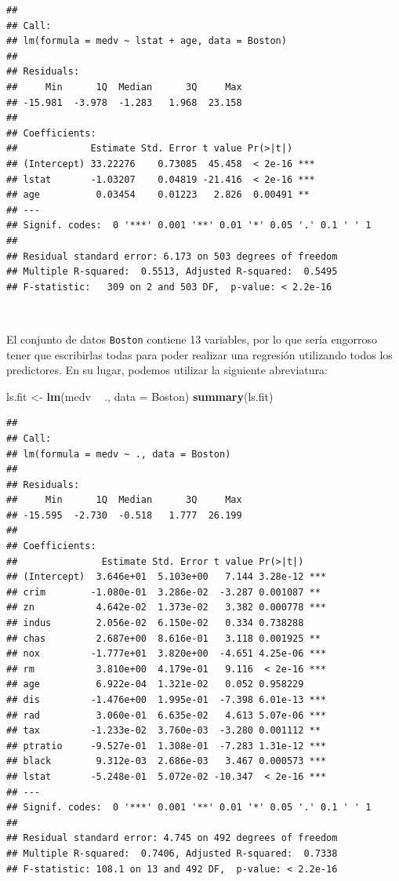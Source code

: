 \documentclass[]{book}
\newenvironment{Shaded}{\begin{snugshade}}{\end{snugshade}}
\newcommand{\KeywordTok}[1]{\textcolor[rgb]{0.13,0.29,0.53}{\textbf{#1}}}
\newcommand{\DataTypeTok}[1]{\textcolor[rgb]{0.13,0.29,0.53}{#1}}
\newcommand{\StringTok}[1]{\textcolor[rgb]{0.31,0.60,0.02}{#1}}
\newcommand{\OperatorTok}[1]{\textcolor[rgb]{0.81,0.36,0.00}{\textbf{#1}}}
\newcommand{\NormalTok}[1]{#1}
\begin{document}
\begin{verbatim}
## 
## Call:
## lm(formula = medv ~ lstat + age, data = Boston)
## 
## Residuals:
##     Min      1Q  Median      3Q     Max 
## -15.981  -3.978  -1.283   1.968  23.158 
## 
## Coefficients:
##             Estimate Std. Error t value Pr(>|t|)    
## (Intercept) 33.22276    0.73085  45.458  < 2e-16 ***
## lstat       -1.03207    0.04819 -21.416  < 2e-16 ***
## age          0.03454    0.01223   2.826  0.00491 ** 
## ---
## Signif. codes:  0 '***' 0.001 '**' 0.01 '*' 0.05 '.' 0.1 ' ' 1
## 
## Residual standard error: 6.173 on 503 degrees of freedom
## Multiple R-squared:  0.5513, Adjusted R-squared:  0.5495 
## F-statistic:   309 on 2 and 503 DF,  p-value: < 2.2e-16
\end{verbatim}

~

El conjunto de datos \texttt{Boston} contiene 13 variables, por lo que
sería engorroso tener que escribirlas todas para poder realizar una
regresión utilizando todos los predictores. En su lugar, podemos
utilizar la siguiente abreviatura:

\begin{Shaded}
\begin{Highlighting}[]
\NormalTok{ls.fit <-}\StringTok{ }\KeywordTok{lm}\NormalTok{(medv }\OperatorTok{~}\StringTok{ }\NormalTok{., }\DataTypeTok{data =}\NormalTok{ Boston)}
\KeywordTok{summary}\NormalTok{(ls.fit)}
\end{Highlighting}
\end{Shaded}

\begin{verbatim}
## 
## Call:
## lm(formula = medv ~ ., data = Boston)
## 
## Residuals:
##     Min      1Q  Median      3Q     Max 
## -15.595  -2.730  -0.518   1.777  26.199 
## 
## Coefficients:
##               Estimate Std. Error t value Pr(>|t|)    
## (Intercept)  3.646e+01  5.103e+00   7.144 3.28e-12 ***
## crim        -1.080e-01  3.286e-02  -3.287 0.001087 ** 
## zn           4.642e-02  1.373e-02   3.382 0.000778 ***
## indus        2.056e-02  6.150e-02   0.334 0.738288    
## chas         2.687e+00  8.616e-01   3.118 0.001925 ** 
## nox         -1.777e+01  3.820e+00  -4.651 4.25e-06 ***
## rm           3.810e+00  4.179e-01   9.116  < 2e-16 ***
## age          6.922e-04  1.321e-02   0.052 0.958229    
## dis         -1.476e+00  1.995e-01  -7.398 6.01e-13 ***
## rad          3.060e-01  6.635e-02   4.613 5.07e-06 ***
## tax         -1.233e-02  3.760e-03  -3.280 0.001112 ** 
## ptratio     -9.527e-01  1.308e-01  -7.283 1.31e-12 ***
## black        9.312e-03  2.686e-03   3.467 0.000573 ***
## lstat       -5.248e-01  5.072e-02 -10.347  < 2e-16 ***
## ---
## Signif. codes:  0 '***' 0.001 '**' 0.01 '*' 0.05 '.' 0.1 ' ' 1
## 
## Residual standard error: 4.745 on 492 degrees of freedom
## Multiple R-squared:  0.7406, Adjusted R-squared:  0.7338 
## F-statistic: 108.1 on 13 and 492 DF,  p-value: < 2.2e-16
\end{verbatim}
\end{document}
